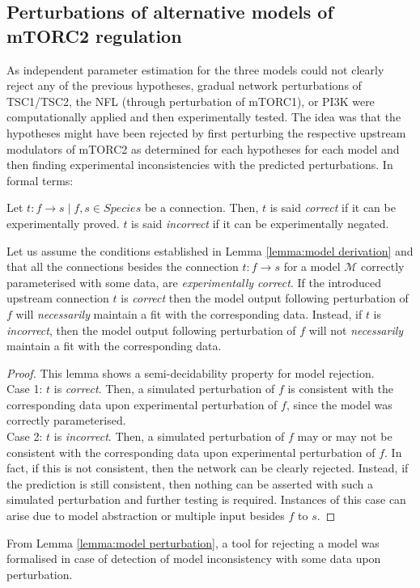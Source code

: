 \subsection{Perturbations of alternative models of mTORC2 regulation}
\label{paper1-subsec:Perturbations of alternative models of mTORC2 regulation}
As independent parameter estimation for the three models could not clearly reject any of the previous hypotheses, gradual network perturbations of TSC1/TSC2, the NFL (through perturbation of mTORC1), or PI3K were computationally applied and then experimentally tested. The idea was that the hypotheses might have been rejected by first perturbing the respective upstream modulators of mTORC2 as determined for each hypotheses for each model and then finding experimental inconsistencies with the predicted perturbations. In formal terms:
\begin{definition}
\label{definition:experimentally correct connection}
Let $t : f \rightarrow s \;|\; f, s \in Species$ be a connection. Then, $t$ is said \emph{correct} if it can be experimentally proved. $t$ is said \emph{incorrect} if it can be experimentally negated. 
\end{definition}

\begin{lemma}
\label{lemma:model perturbation}
Let us assume the conditions established in Lemma \ref{lemma:model derivation} and that all the connections besides the connection $t : f \rightarrow s$ for a model $\mathcal{M}$ correctly parameterised with some data, are \emph{experimentally correct}. 
If the introduced upstream connection $t$ is \emph{correct} then the model output following perturbation of $f$ will \emph{necessarily} maintain a fit with the corresponding data. Instead, if $t$ is \emph{incorrect}, then the model output following perturbation of $f$ will not \emph{necessarily} maintain a fit with the corresponding data.
\end{lemma}
\begin{proof}
This lemma shows a semi-decidability property for model rejection. \\
Case 1: $t$ is \emph{correct}. Then, a simulated perturbation of $f$ is consistent with the corresponding data upon experimental perturbation of $f$, since the model was correctly parameterised. \\
Case 2: $t$ is \emph{incorrect}. Then, a simulated perturbation of $f$ may or may not be consistent with the corresponding data upon experimental perturbation of $f$. In fact, if this is not consistent, then the network can be clearly rejected. Instead, if the prediction is still consistent, then nothing can be asserted with such a simulated perturbation and further testing is required. Instances of this case can arise due to model abstraction or multiple input besides $f$ to $s$.
\end{proof}
From Lemma \ref{lemma:model perturbation}, a tool for rejecting a model was formalised in case of detection of model inconsistency with some data upon perturbation.\\

